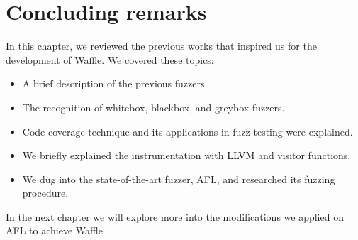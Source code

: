 \section{Concluding remarks}

In this chapter, we reviewed the previous works that inspired us for the development of Waffle. We covered these topics:

\begin{itemize}
    \item A brief description of the previous fuzzers.
    \item The recognition of whitebox, blackbox, and greybox fuzzers.
    \item Code coverage technique and its applications in fuzz testing were explained.
    \item We briefly explained the instrumentation with LLVM and visitor functions.
    \item We dug into the state-of-the-art fuzzer, AFL, and researched its fuzzing procedure.
\end{itemize}

In the next chapter we will explore more into the modifications we applied on AFL to achieve Waffle.